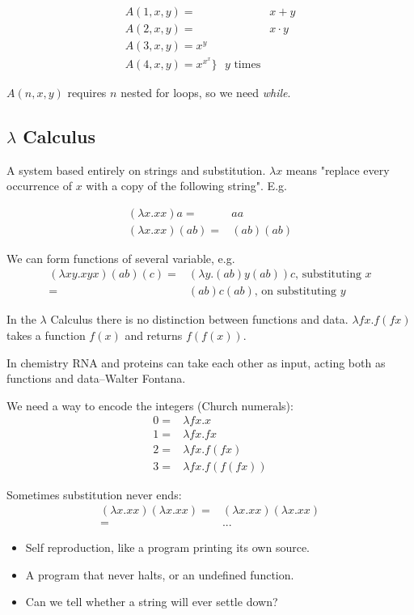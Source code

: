 \documentclass[]{article}
\begin{document}
\begin{align*}
	A(1,x,y) =& x+y\\
	A(2,x,y) =& x \cdot y\\
	A(3,x,y) = x^y\\
	A(4,x,y) = x^{x^x} \rbrace \text{ $y$ times}
\end{align*} 

$A(n,x,y)$ requires $n$ nested for loops, so we need \emph{while}.

\subsection{$\lambda$ Calculus}

A system based entirely on strings and substitution. $\lambda x$ means "replace every occurrence of $x$ with a copy of the following string". E.g.

\begin{align*}
	(\lambda x.xx)a=&aa\\
	(\lambda x.xx)(ab)=&(ab)(ab)
\end{align*}

We can form functions of several variable, e.g.
\begin{align*}
	(\lambda xy.xyx)(ab)(c) =& (\lambda y.(ab)y(ab))c \text{, substituting $x$}\\
	=& (ab)c(ab) \text{, on substituting $y$}
\end{align*}

In the $\lambda$ Calculus there is no distinction between functions and data. $\lambda fx.f(fx)$ takes a function $f(x)$ and returns $f(f(x))$.

In chemistry RNA and proteins can take each other as input, acting both as functions and data--Walter Fontana.

We need a way to encode the integers (Church numerals):
\begin{align*}
	0=&\lambda fx.x\\
	1=&\lambda fx.fx\\
	2=&\lambda fx.f(fx)\\
	3=&\lambda fx.f(f(fx))
\end{align*}

Sometimes substitution never ends:
\begin{align*}
	(\lambda x.xx)	(\lambda x.xx) =& (\lambda x.xx)	(\lambda x.xx)\\
	=&...
\end{align*}

\begin{itemize}
	\item Self reproduction, like a program printing its own source. 
	\item A program that never halts, or an undefined function.
	\item Can we tell whether a string will ever settle down?
\end{itemize}
\end{document}
